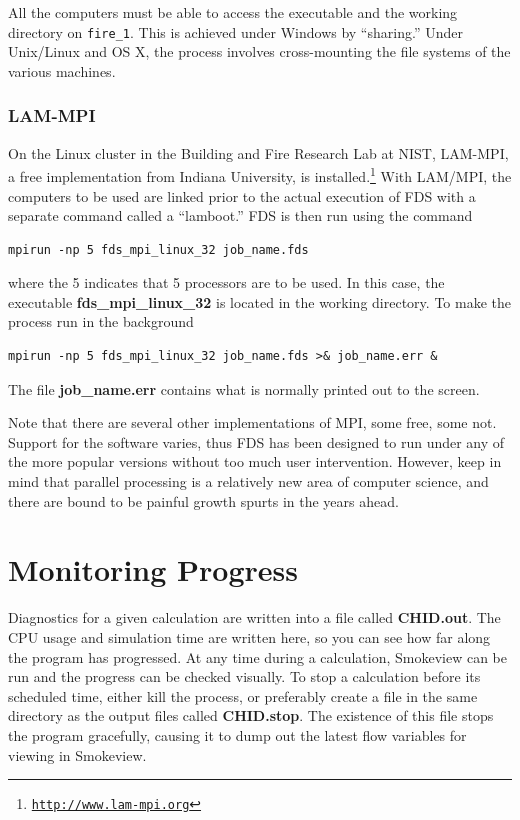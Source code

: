 \documentclass[11pt]{book}
\newcommand{\ct}{\tt\small}
\begin{document}
\begin{warning}
\noindent
All the computers must be able to access the executable and the working directory on {\ct fire\_1}.
This is achieved under Windows by ``sharing.'' Under Unix/Linux and OS X, the process involves cross-mounting the file
systems of the various machines.
\end{warning}


\subsubsection{LAM-MPI}

On the Linux cluster in the Building and Fire Research Lab at NIST, LAM-MPI, a free implementation from Indiana University,
is installed.\footnote{\href{http://www.lam-mpi.org}{{\ct http://www.lam-mpi.org}}}
With LAM/MPI, the computers to be used are linked prior to the actual execution of FDS with a separate
command called a ``lamboot.''
FDS is then run using the command
\begin{verbatim}
mpirun -np 5 fds_mpi_linux_32 job_name.fds
\end{verbatim}
where the 5 indicates that 5 processors are to be used. In this case, the executable {\bf fds\_mpi\_linux\_32} is located in the
working directory. To make the process run in the background
\begin{verbatim}
mpirun -np 5 fds_mpi_linux_32 job_name.fds >& job_name.err &
\end{verbatim}
The file {\bf job\_name.err} contains what is normally printed out to the screen.


\begin{warning}
\noindent
Note that there are several other implementations of MPI, some free, some not.
Support for the software varies, thus FDS has been designed to run under any of the
more popular versions without too much user intervention. However, keep in mind
that parallel processing is a relatively new area of computer science,
and there are bound to be painful growth spurts in the years ahead.
\end{warning}


\section{Monitoring Progress}

Diagnostics for a given calculation are written into a file called {\bf CHID.out}.
The CPU usage and simulation time are written here, so you can see how
far along the program has progressed. At any time during a calculation,
Smokeview can be run and the progress can be checked visually.
To stop a calculation before its scheduled time, either
kill the process, or preferably create a file in the same directory as
the output files called {\bf CHID.stop}. The existence of this
file stops the program gracefully, causing it to dump out the
latest flow variables for viewing in Smokeview.
\end{document}

